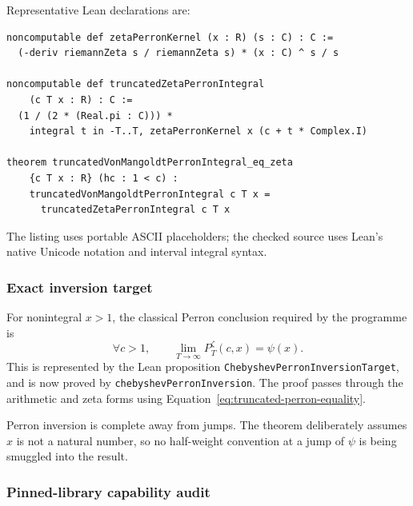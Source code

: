 \documentclass[11pt,a4paper]{article}
\newcommand{\code}[1]{\texttt{#1}}
\begin{document}
Representative Lean declarations are:
\begin{lstlisting}
noncomputable def zetaPerronKernel (x : R) (s : C) : C :=
  (-deriv riemannZeta s / riemannZeta s) * (x : C) ^ s / s

noncomputable def truncatedZetaPerronIntegral
    (c T x : R) : C :=
  (1 / (2 * (Real.pi : C))) *
    integral t in -T..T, zetaPerronKernel x (c + t * Complex.I)

theorem truncatedVonMangoldtPerronIntegral_eq_zeta
    {c T x : R} (hc : 1 < c) :
    truncatedVonMangoldtPerronIntegral c T x =
      truncatedZetaPerronIntegral c T x
\end{lstlisting}
The listing uses portable ASCII placeholders; the checked source uses Lean's
native Unicode notation and interval integral syntax.

\subsubsection{Exact inversion target}

For nonintegral $x>1$, the classical Perron conclusion required by the programme
is
\begin{equation}
  \forall c>1,\qquad
  \lim_{T\to\infty}P^{\zeta}_T(c,x)=\psi(x).
  \label{eq:chebyshev-perron-target}
\end{equation}
This is represented by the Lean proposition
\code{ChebyshevPerronInversionTarget}, and is now proved by
\code{chebyshevPerronInversion}. The proof passes through the arithmetic and
zeta forms using Equation~\eqref{eq:truncated-perron-equality}.

\begin{warningbox}
Perron inversion is complete away from jumps. The theorem deliberately assumes
$x$ is not a natural number, so no half-weight convention at a jump of
$\psi$ is being smuggled into the result.
\end{warningbox}

\subsubsection{Pinned-library capability audit}
\end{document}
